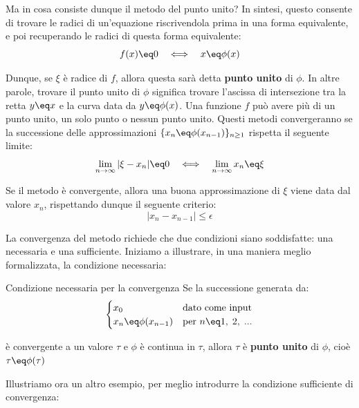 Ma in cosa consiste dunque il metodo del punto unito? In sintesi, questo consente di trovare le radici di un'equazione riscrivendola prima in una forma equivalente, e poi recuperando le radici di questa forma equivalente:
\[ f(x) \eq 0 \quad \Longleftrightarrow \quad x \eq \phi(x) \]

Dunque, se $\xi$ è radice di $f$, allora questa sarà detta \textbf{punto unito} di $\phi$. In altre parole, trovare il punto unito di $\phi$ significa trovare l'ascissa di intersezione tra la retta $y \eq x$ e la curva data da $y \eq \phi(x)$. Una funzione $f$ può avere più di un punto unito, un solo punto o nessun punto unito.
\nwl
Questi metodi convergeranno se la successione delle approssimazioni $\{ x_n \eq \phi(x_{n - 1})\}_{n \geq 1}$ rispetta il seguente limite:
\[ \lim_{n \to \infty} |\xi - x_n| \eq 0 \quad \Longleftrightarrow \quad \lim_{n \to \infty} x_n \eq \xi \]

Se il metodo è convergente, allora una buona approssimazione di $\xi$ viene data dal valore $x_n$, rispettando dunque il seguente criterio:
\[ |x_n - x_{n - 1}| \leq \epsilon \]

La convergenza del metodo richiede che due condizioni siano soddisfatte: una necessaria e una sufficiente. Iniziamo a illustrare, in una maniera meglio formalizzata, la condizione necessaria:

\begin{theorem}{Condizione necessaria per la convergenza}
    Se la successione generata da:
    \[ \begin{cases}
        x_0 & \text{dato come input} \\
        x_n \eq \phi(x_{n - 1}) & \text{per } n \eq 1, \; 2, \; ...
    \end{cases} \]

    è convergente a un valore $\tau$ e $\phi$ è continua in $\tau$, allora $\tau$ è \textbf{punto unito} di $\phi$, cioè $\tau \eq \phi(\tau)$
\end{theorem}

Illustriamo ora un altro esempio, per meglio introdurre la condizione sufficiente di convergenza:

